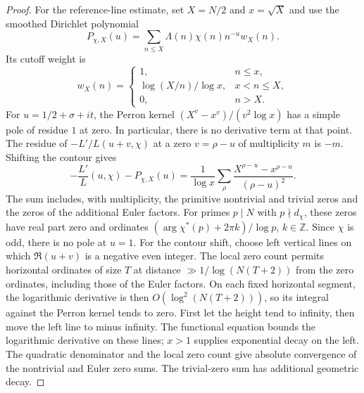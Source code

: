 \documentclass[12pt,a4paper]{amsart}
\numberwithin{equation}{section}
\def\le{\leqslant}
\theoremstyle{plain}
\theoremstyle{definition}
\theoremstyle{remark}
\begin{document}
\begin{proof}
For the reference-line estimate, set $X=N/2$ and $x=\sqrt X$
and use the smoothed Dirichlet polynomial
\[
 P_{\chi,X}(u)=
 \sum_{n\le X}\Lambda(n)\chi(n)n^{-u}w_X(n).
\]
Its cutoff weight is
\[
 w_X(n)=\begin{cases}
 1,&n\le x,\\
 \log(X/n)/\log x,&x<n\le X,\\
 0,&n>X.
 \end{cases}
\]
For $u=1/2+\sigma+it$, the Perron kernel
$(X^v-x^v)/(v^2\log x)$ has a simple pole of residue $1$
at zero. In particular, there is no derivative term at that
point. The residue of $-L'/L(u+v,\chi)$ at a zero
$v=\rho-u$ of multiplicity $m$ is $-m$. Shifting the contour gives
\begin{equation}\label{proof:grh:smoothed-truncation}
 -\frac{L'}L(u,\chi)-P_{\chi,X}(u)
 =\frac1{\log x}\sum_\rho
          \frac{X^{\rho-u}-x^{\rho-u}}{(\rho-u)^2}.
\end{equation}
The sum includes, with multiplicity, the primitive nontrivial and
trivial zeros and the zeros of the additional Euler factors.
For primes $p\mid N$ with $p\nmid d_\chi$, these zeros have
real part zero and ordinates
$(\arg\chi^*(p)+2\pi k)/\log p$, $k\in\mathbb Z$.
Since $\chi$ is odd, there is no pole at $u=1$. For the contour
shift, choose left vertical lines on which $\Re(u+v)$ is a negative
even integer. The local zero count permits horizontal ordinates
of size $T$ at distance $\gg1/\log(N(T+2))$ from the zero ordinates,
including those of the Euler factors. On each fixed horizontal
segment, the logarithmic derivative is then
$O(\log^2(N(T+2)))$, so its integral against the Perron kernel
tends to zero. First let the height tend to infinity, then move
the left line to minus infinity. The functional equation bounds the
logarithmic derivative on these lines; $x>1$ supplies exponential
decay on the left. The quadratic denominator and the local zero
count give absolute convergence of the nontrivial and Euler
zero sums. The trivial-zero sum has additional geometric decay.


\end{proof}
\end{document}
